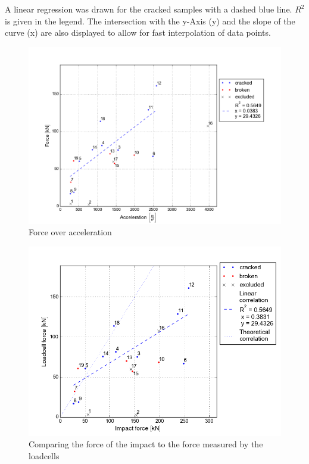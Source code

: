 A linear regression was drawn for the cracked samples with a dashed blue line. \(R^2\) is given in the legend. The intersection with the y-Axis (y) and the slope of the curve (x) are also displayed to allow for fast interpolation of data points.

\begin{figure}[p]
    \centering
    \includegraphics[width=0.95 \linewidth]{./diagram/Force_Acceleration}
    \caption{Force over acceleration}
    \label{fig:Acceleration_Force}
\end{figure}

\begin{figure}[p]
    \centering
    \includegraphics[width=0.95 \linewidth]{diagram/compare_impact_loadcell_force.png}
    \caption{Comparing the force of the impact to the force measured by the loadcells}
    \label{fig:compare_force}
\end{figure}

